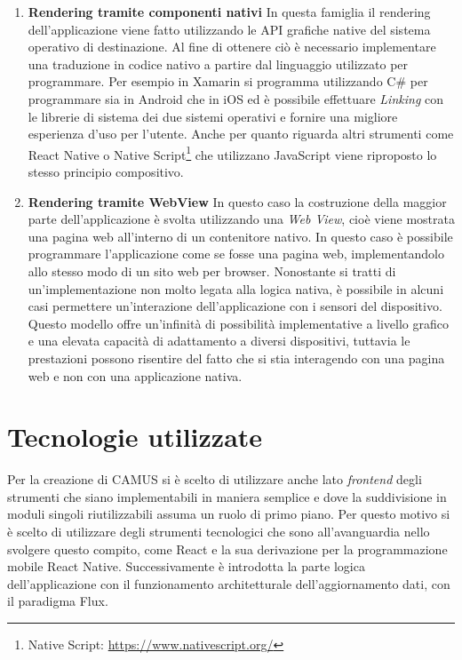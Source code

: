 \begin{enumerate}
	\item \textbf{Rendering tramite componenti nativi} In questa famiglia il rendering dell'applicazione viene fatto utilizzando le API grafiche native del sistema operativo di destinazione.
	Al fine di ottenere ciò è necessario implementare una traduzione in codice nativo a partire dal linguaggio utilizzato per programmare. Per esempio in Xamarin si programma utilizzando C\# per programmare sia in Android che in iOS ed è possibile effettuare \emph{Linking} con le librerie di sistema dei due sistemi operativi e fornire una migliore esperienza d'uso per l'utente. Anche per quanto riguarda altri strumenti come React Native o Native Script\footnote{Native Script: \url{https://www.nativescript.org/}} che utilizzano JavaScript viene riproposto lo stesso principio compositivo.
	\item \textbf{Rendering tramite WebView} In questo caso la costruzione della maggior parte dell'applicazione è svolta utilizzando una \emph{Web View}, cioè viene mostrata una pagina web all'interno di un contenitore nativo.
	In questo caso è possibile programmare l'applicazione come se fosse una pagina web, implementandolo allo stesso modo di un sito web per browser. Nonostante si tratti di un'implementazione non molto legata alla logica nativa, è possibile in alcuni casi permettere un'interazione dell'applicazione con i sensori del dispositivo.
	Questo modello offre un'infinità di possibilità implementative a livello grafico e una elevata capacità di adattamento a diversi dispositivi, tuttavia le prestazioni possono risentire del fatto che si stia interagendo con una pagina web e non con una applicazione nativa.
\end{enumerate}

\section{Tecnologie utilizzate}\label{sec:tecnologie-app}
Per la creazione di CAMUS si è scelto di utilizzare anche lato \emph{frontend} degli strumenti che siano implementabili in maniera semplice e dove la suddivisione in moduli singoli riutilizzabili assuma un ruolo di primo piano. Per questo motivo si è scelto di utilizzare degli strumenti tecnologici che sono all'avanguardia nello svolgere questo compito, come React e la sua derivazione per la programmazione mobile React Native. Successivamente è introdotta la parte logica dell'applicazione con il funzionamento architetturale dell'aggiornamento dati, con il paradigma Flux.

